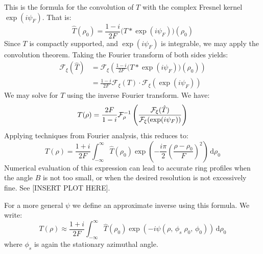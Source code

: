 \documentclass{article}
\begin{document}
        This is the formula for the convolution of $T$ with the complex
        Fresnel kernel $\exp(i\psi_{F})$. That is:
        \begin{equation}
            \hat{T}(\rho_{0})
            =\frac{1-i}{2F}\big(T*\exp(i\psi_{F})\big)(\rho_{0})
        \end{equation}
        Since $T$ is compactly supported, and $\exp(i\psi_{F})$ is integrable,
        we may apply the convolution theorem. Taking the Fourier transform
        of both sides yields:
        \begin{subequations}
            \begin{align}
                \mathcal{F}_{\xi}(\hat{T})
                &=\mathcal{F}_{\xi}\left(
                    \frac{1-i}{2F}\big(T*\exp(i\psi_{F})\big)(\rho_{0})
                \right)\\
                &=\frac{1-i}{2F}\mathcal{F}_{\xi}\left(T\right)\cdot
                    \mathcal{F}_{\xi}\left(\exp(i\psi_{F})\right)
            \end{align}
        \end{subequations}
        We may solve for $T$ using the inverse Fourier transform. We have:
        \begin{equation}
            T(\rho)=\frac{2F}{1-i}\mathcal{F}^{-1}_{\rho}\left(
                \frac{%
                    \mathcal{F}_{\xi}(\hat{T})%
                }{%
                    \mathcal{F}_{\xi}(\exp(i\psi_{F}))
                }
            \right)
        \end{equation}
        Applying techniques from Fourier analysis, this reduces to:
        \begin{equation}
            T(\rho)=\frac{1+i}{2F}\int_{-\infty}^{\infty}
                \hat{T}(\rho_{0})\exp\left(
                    -\frac{i\pi}{2}\left(\frac{\rho-\rho_{0}}{F}\right)^{2}
                \right)\,\textrm{d}\rho_{0}
        \end{equation}
        Numerical evaluation of this expression can lead to accurate
        ring profiles when the angle $B$ is not too small, or when the
        desired resolution is not excessively fine. See
        [INSERT PLOT HERE].
        \par\hfill\par
        For a more general $\psi$ we define an approximate inverse using this
        formula. We write:
        \begin{equation}
            T(\rho)
            \approx\frac{1+i}{2F}\int_{-\infty}^{\infty}
                \hat{T}(\rho_{0})\exp\left(
                    -i\psi(\rho,\,\phi_{s}\;\rho_{0},\,\phi_{0})
                \right)\,\textrm{d}\rho_{0}
        \end{equation}
        where $\phi_{s}$ is again the stationary azimuthal angle.
\end{document}
